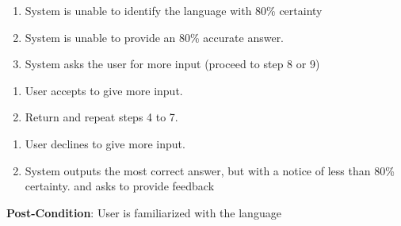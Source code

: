 	\begin{enumerate}[{\bf 7.}i.]
		\item  System is unable to identify the language with 80\% certainty
		\item System is unable to provide an 80\% accurate answer.
		\item System asks the user for more input (proceed to step 8 or 9)
	\end{enumerate}
	\begin{enumerate}[{\bf 8.}i.]
		\item User accepts to give more input.
		\item Return and repeat steps 4 to 7.
	\end{enumerate}
	\begin{enumerate}[{\bf 9}i.]
		\item User declines to give more input.
		\item System outputs the most correct answer, but with a notice of less than 80\% certainty. and asks to provide feedback
	\end{enumerate}
	\textbf{Post-Condition}: User is familiarized with the language